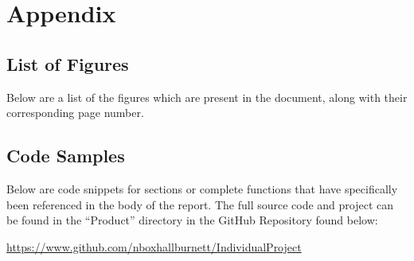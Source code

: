 \setcounter{secnumdepth}{-2}

\chapter{Appendix}
\label{appendix}

\setcounter{chapter}{2}
\renewcommand{\thechapter}{\Alph{chapter}}
\setcounter{secnumdepth}{2}

\renewcommand\thesection{\Alph{section}}

	\begingroup
		\section{List of Figures}
		\label{appendix:figures}

		Below are a list of the figures which are present in the document, along with their corresponding page number.

		\renewcommand{\chapter}[2]{}		%
		\listoffigures						%
	\endgroup

\newpage
	\section{Code Samples}
	\label{appendix:code}

		Below are code snippets for sections or complete functions that have specifically been referenced in the body of the report.
		The full source code and project can be found in the \enquote{Product} directory in the GitHub Repository found below:

		\url{https://www.github.com/nboxhallburnett/IndividualProject}

